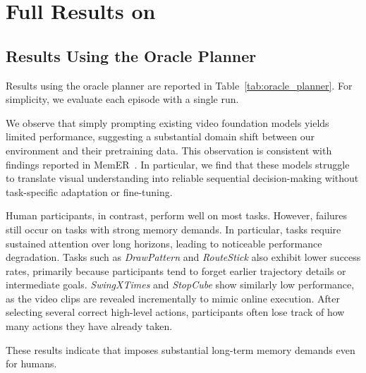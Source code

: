 \section{Full Results on \benchname}
\label{sec:appx_full_results}

\subsection{Results Using the Oracle Planner}
\label{sec:results_oracle_planner}

Results using the oracle planner are reported in Table~\ref{tab:oracle_planner}. For simplicity, we evaluate each episode with a single run.

We observe that simply prompting existing video foundation models yields limited performance, suggesting a substantial domain shift between our environment and their pretraining data. 
This observation is consistent with findings reported in MemER~\cite{sridhar2025memer}. 
In particular, we find that these models struggle to translate visual understanding into reliable sequential decision-making without task-specific adaptation or fine-tuning.

Human participants, in contrast, perform well on most tasks. However, failures still occur on tasks with strong memory demands. In particular, \TStwo\xspace tasks require sustained attention over long horizons, leading to noticeable performance degradation. Tasks such as \textit{DrawPattern} and \textit{RouteStick} also exhibit lower success rates, primarily because participants tend to forget earlier trajectory details or intermediate goals.
\textit{SwingXTimes} and \textit{StopCube} show similarly low performance, as the video clips are revealed incrementally to mimic online execution. After selecting several correct high-level actions, participants often lose track of how many actions they have already taken.

These results indicate that \benchname\xspace imposes substantial long-term memory demands even for humans.


